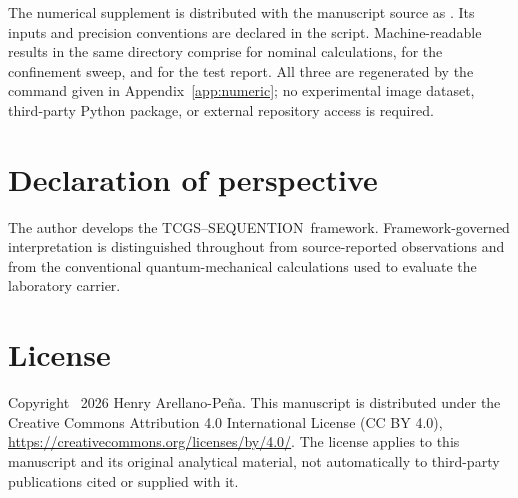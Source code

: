 \documentclass[11pt,a4paper]{article}
\theoremstyle{definition}
\theoremstyle{remark}
\newcommand{\TCGS}{TCGS--SEQUENTION}
\begin{document}
The numerical supplement is distributed with the manuscript source as . Its inputs and precision conventions are declared in the script. Machine-readable results in the same  directory comprise  for nominal calculations,  for the confinement sweep, and  for the test report. All three are regenerated by the command given in Appendix~\ref{app:numeric}; no experimental image dataset, third-party Python package, or external repository access is required.

\section*{Declaration of perspective}
The author develops the \TCGS\ framework. Framework-governed interpretation is distinguished throughout from source-reported observations and from the conventional quantum-mechanical calculations used to evaluate the laboratory carrier.

\section*{License}
Copyright \textcopyright\ 2026 Henry Arellano-Pe\~na. This manuscript is distributed under the Creative Commons Attribution 4.0 International License (CC BY 4.0), \url{https://creativecommons.org/licenses/by/4.0/}. The license applies to this manuscript and its original analytical material, not automatically to third-party publications cited or supplied with it.
\end{document}
